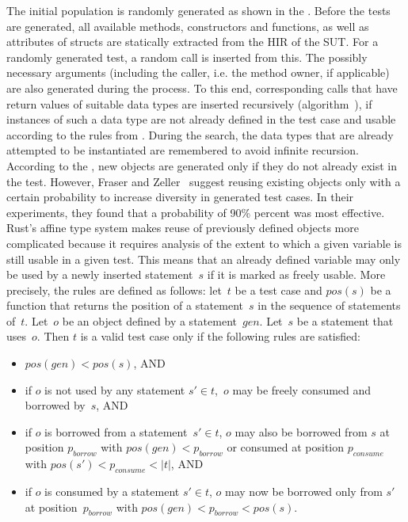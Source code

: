 \documentclass[paper=a4,%
  twoside,%
  BCOR4mm,%
  abstract=true,%
  toc=bibliography,%
  chapterprefix=true,%
  toc=bibliographynumbered,%
  open=right,%
  english,%
  pagesize=pdftex]{scrreprt}
\begin{document}
The initial population is randomly generated as shown in the . Before the tests are generated, all available methods, constructors and functions, as well as attributes of structs are statically extracted from the \ac{HIR} of the \ac{SUT}. For a randomly generated test, a random call is inserted from this. The possibly necessary arguments (including the caller, i.e. the method owner, if applicable) are also generated during the process. To this end, corresponding calls that have return values of suitable data types are inserted recursively (algorithm~), if instances of such a data type are not already defined in the test case and usable according to the rules from . During the search, the data types that are already attempted to be instantiated are remembered to avoid infinite recursion. According to the , new objects are generated only if they do not already exist in the test. However, Fraser and Zeller~\cite{Fraser2012} suggest reusing existing objects only with a certain probability to increase diversity in generated test cases. In their experiments, they found that a probability of 90\% percent was most effective. Rust's affine type system makes reuse of previously defined objects more complicated because it requires analysis of the extent to which a given variable is still usable in a given test. This means that an already defined variable may only be used by a newly inserted statement~$s$ if it is marked as freely usable. More precisely, the rules are defined as follows: let~$t$ be a test case and $pos(s)$ be a function that returns the position of a statement~$s$ in the sequence of statements of~$t$. Let~$o$ be an object defined by a statement~$gen$. Let~$s$ be a statement that uses~$o$. Then $t$ is a valid test case only if the following rules are satisfied:

\begin{itemize}
    \item $pos(gen) < pos(s)$, AND
    \item if $o$ is not used by any statement $s' \in t$,~$o$ may be freely consumed and borrowed by~$s$, AND
    \item if $o$ is borrowed from a statement~$s' \in t$, $o$ may also be borrowed from $s$ at position $p_{borrow}$ with $pos(gen) < p_{borrow}$ or consumed at position $p_{consume}$ with $pos(s') < p_{consume} < \left|t\right|$, AND
    \item if $o$ is consumed by a statement $s' \in t$, $o$ may now be borrowed only from $s'$ at position~$p_{borrow}$ with $pos(gen) < p_{borrow} < pos(s)$.
\end{itemize}
\end{document}
